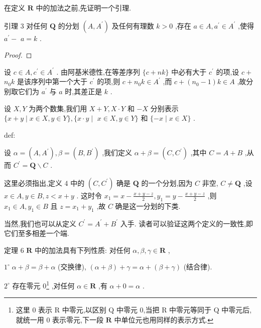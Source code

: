 在定义 \(\mathbf{R}\) 中的加法之前,先证明一个引理.

引理 3 对任何 \(\mathbf{Q}\) 的分划 \(\left( {A,{A}^{\prime }}\right)\) 及任何有理数 \(k > 0\) ,存在 \(a \in  A,{a}^{\prime } \in  {A}^{\prime }\) ,使得 \({a}^{\prime } -\)  \(a = k\) .

\begin{proof}

\end{proof}
设 \(c \in  A,{c}^{\prime } \in  {A}^{\prime }\) . 由阿基米德性,在等差序列 \(\{ c + {nk}\}\) 中必有大于 \({c}^{\prime }\) 的项,设 \(c +\)  \({n}_{0}k\) 是该序列中第一个大于 \({c}^{\prime }\) 的项,则 \(c + {n}_{0}k \in  {A}^{\prime }\) ,而 \(c + \left( {{n}_{0} - 1}\right) k \in  A\) ,故分别取它们为 \({a}^{\prime }\) 与 \(a\) 时,其差正是 \(k\) .

设 \(X,Y\) 为两个数集,我们用 \(X + Y,X \cdot  Y\) 和 \(- X\) 分别表示 \(\{ x + y \mid  x \in  X,y \in  Y\} ,\{ x \cdot  y \mid\)  \(x \in  X,y \in  Y\}\) 和 \(\{  - x \mid  x \in  X\}\) .

\begin{definition}{}{def:}

\end{definition}
设 \(\alpha  = \left( {A,{A}^{\prime }}\right) ,\beta  = \left( {B,{B}^{\prime }}\right)\) ,我们定义 \(\alpha  + \beta  = \left( {C,{C}^{\prime }}\right)\) ,其中 \(C = A + B\) ,从而 \({C}^{\prime } = \mathbf{Q} \smallsetminus  C\) .

这里必须指出,定义 4 中的 \(\left( {C,{C}^{\prime }}\right)\) 确是 \(\mathbf{Q}\) 的一个分划,因为 \(C\) 非空, \(C \neq  \mathbf{Q}\) ,设 \(x \in  A,y \in  B,z < x + y\) . 这时令 \({x}_{1} = x - \frac{x + y - z}{2},{y}_{1} = y - \frac{x + y - z}{2}\) ,则 \({x}_{1} \in  A,{y}_{1} \in  B\) 且 \(z = {x}_{1} + {y}_{1}\) ,故 \(C\) 确是这一分划的下类.

当然,我们也可以从定义 \({C}^{\prime } = {A}^{\prime } + {B}^{\prime }\) 入手. 读者可以验证这两个定义的一致性,即它们至多相差一个端.

定理 6 \(\mathbf{R}\) 中的加法具有下列性质: 对任何 \(\alpha ,\beta ,\gamma  \in  \mathbf{R}\) ,

\({1}^{ \circ  }\;\alpha  + \beta  = \beta  + \alpha\) (交换律), \(\left( {\alpha  + \beta }\right)  + \gamma  = \alpha  + \left( {\beta  + \gamma }\right)\) (结合律).

\({2}^{ \circ  }\) 存在零元 \({0}\)\footnote{这里 0 表示 \(\mathrm{R}\) 中零元,以区别 \(\mathrm{Q}\) 中零元 0,当把 \(\mathrm{R}\) 中零元等同于 \(\mathrm{Q}\) 中零元后,就统一用 0 表示零元,下一段 \(\mathbf{R}\) 中单位元也用同样的表示方式.} ,对任何 \(\alpha  \in  \mathbf{R}\) ,有 \(\alpha  + 0 = \alpha\) .

